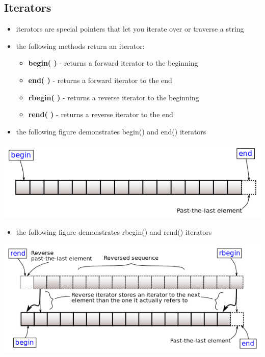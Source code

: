 \documentclass[11pt]{article}
\providecommand{\tightlist}{%
      \setlength{\itemsep}{0pt}\setlength{\parskip}{0pt}}
\begin{document}
    \hypertarget{iterators}{%
\subsection{Iterators}\label{iterators}}

\begin{itemize}
\tightlist
\item
  iterators are special pointers that let you iterate over or traverse a
  string
\item
  the following methods return an iterator:

  \begin{itemize}
  \tightlist
  \item
    \textbf{begin( )} - returns a forward iterator to the beginning
  \item
    \textbf{end( )} - returns a forward iterator to the end
  \item
    \textbf{rbegin( )} - returns a reverse iterator to the beginning
  \item
    \textbf{rend( )} - returns a reverse iterator to the end
  \end{itemize}
\item
  the following figure demonstrates begin() and end() iterators
\end{itemize}

\includegraphics{resources/range-begin-end.png}

\begin{itemize}
\tightlist
\item
  the following figure demonstrates rbegin() and rend() iterators
\end{itemize}

\includegraphics{resources/range-rbegin-rend.png}
\end{document}
